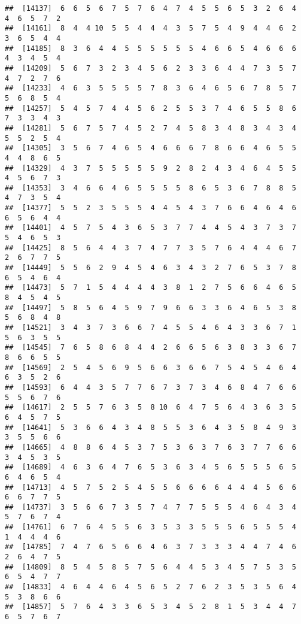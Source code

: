 \documentclass[
]{book}
\begin{document}
\begin{verbatim}
##  [14137]  6  6  5  6  7  5  7  6  4  7  4  5  5  6  5  3  2  6  4  4  6  5  7  2
##  [14161]  8  4  4 10  5  5  4  4  4  3  5  7  5  4  9  4  4  6  2  3  6  5  4  4
##  [14185]  8  3  6  4  4  5  5  5  5  5  5  4  6  6  5  4  6  6  6  4  3  4  5  4
##  [14209]  5  6  7  3  2  3  4  5  6  2  3  3  6  4  4  7  3  5  7  4  7  2  7  6
##  [14233]  4  6  3  5  5  5  5  7  8  3  6  4  6  5  6  7  8  5  7  5  6  8  5  4
##  [14257]  5  4  5  7  4  4  5  6  2  5  5  3  7  4  6  5  5  8  6  7  3  3  4  3
##  [14281]  5  6  7  5  7  4  5  2  7  4  5  8  3  4  8  3  4  3  4  5  5  2  5  4
##  [14305]  3  5  6  7  4  6  5  4  6  6  6  7  8  6  6  4  6  5  5  4  4  8  6  5
##  [14329]  4  3  7  5  5  5  5  5  9  2  8  2  4  3  4  6  4  5  5  4  5  6  7  3
##  [14353]  3  4  6  6  4  6  5  5  5  5  8  6  5  3  6  7  8  8  5  4  7  3  5  4
##  [14377]  5  5  2  3  5  5  5  4  4  5  4  3  7  6  6  4  6  4  6  6  5  6  4  4
##  [14401]  4  5  7  5  4  3  6  5  3  7  7  4  4  5  4  3  7  3  7  5  4  6  5  3
##  [14425]  8  5  6  4  4  3  7  4  7  7  3  5  7  6  4  4  4  6  7  2  6  7  7  5
##  [14449]  5  5  6  2  9  4  5  4  6  3  4  3  2  7  6  5  3  7  8  6  5  4  6  4
##  [14473]  5  7  1  5  4  4  4  4  3  8  1  2  7  5  6  6  4  6  5  8  4  5  4  5
##  [14497]  5  8  5  6  4  5  9  7  9  6  6  3  3  6  4  6  5  3  8  5  6  8  4  8
##  [14521]  3  4  3  7  3  6  6  7  4  5  5  4  6  4  3  3  6  7  1  5  6  3  5  5
##  [14545]  7  6  5  8  6  8  4  4  2  6  6  5  6  3  8  3  3  6  7  8  6  6  5  5
##  [14569]  2  5  4  5  6  9  5  6  6  3  6  6  7  5  4  5  4  6  4  6  3  5  2  6
##  [14593]  6  4  4  3  5  7  7  6  7  3  7  3  4  6  8  4  7  6  6  5  5  6  7  6
##  [14617]  2  5  5  7  6  3  5  8 10  6  4  7  5  6  4  3  6  3  5  6  4  5  7  5
##  [14641]  5  3  6  6  4  3  4  8  5  5  3  6  4  3  5  8  4  9  3  3  5  5  6  6
##  [14665]  4  8  8  6  4  5  3  7  5  3  6  3  7  6  3  7  7  6  6  3  4  5  3  5
##  [14689]  4  6  3  6  4  7  6  5  3  6  3  4  5  6  5  5  5  6  5  6  4  6  5  4
##  [14713]  4  5  7  5  2  5  4  5  5  6  6  6  6  4  4  4  5  6  6  6  6  7  7  5
##  [14737]  3  5  6  6  7  3  5  7  4  7  7  5  5  5  4  6  4  3  4  5  7  6  7  4
##  [14761]  6  7  6  4  5  5  6  3  5  3  3  5  5  5  6  5  5  5  4  1  4  4  4  6
##  [14785]  7  4  7  6  5  6  6  4  6  3  7  3  3  3  4  4  7  4  6  2  6  4  7  5
##  [14809]  8  5  4  5  8  5  7  5  6  4  4  5  3  4  5  7  5  3  5  6  5  4  7  7
##  [14833]  4  6  4  4  6  4  5  6  5  2  7  6  2  3  5  3  5  6  4  5  3  8  6  6
##  [14857]  5  7  6  4  3  3  6  5  3  4  5  2  8  1  5  3  4  4  7  6  5  7  6  7

\end{verbatim}
\end{document}
